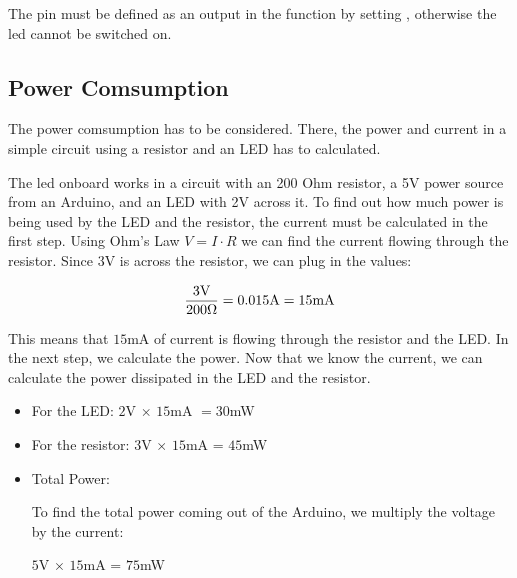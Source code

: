 The pin must be defined as an output in the function  by setting , otherwise the \ac{led} cannot be switched on.

\medskip 



\subsection{Power Comsumption}\label{LEDPowerComsumption}

The power comsumption has to be considered. There, the power and current in a simple circuit using a resistor and an LED has to calculated.

The led onboard works in a circuit with an 200 Ohm resistor, a 5V power source from an Arduino, and an LED with 2V across it. To find out how much power is being used by the LED and the resistor, the current must be calculated in the first step. Using Ohm's Law $V = I \cdot R$ we can find the current flowing through the resistor. Since 3V is across the resistor, we can plug in the values:

\medskip

$$\frac{3\hbox{V}}{200 \Omega} = 0.015 \hbox{A} = 15\hbox{mA}$$

\medskip

This means that $15$mA of current is flowing through the resistor and the LED. In the next step, we calculate the power. Now that we know the current, we can calculate the power dissipated in the LED and the resistor.

\begin{itemize}
  \item For the LED: $2$V $\times$ $15$mA $= 30$mW
  \item For the resistor: $3$V $\times$ $15$mA = $45$mW
  \item Total Power:

     To find the total power coming out of the Arduino, we multiply the voltage by the current:

              $5$V $\times$ $15$mA = $75$mW
\end{itemize}

